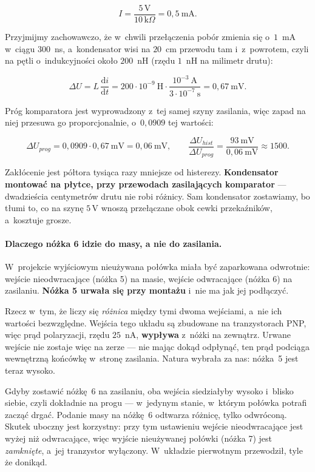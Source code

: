 \documentclass[a4paper,11pt]{article}
\newcommand{\kohm}{\,\mathrm{k}\Omega}
\newcommand{\volt}{\,\mathrm{V}}
\begin{document}
\[
I=\frac{5\volt}{10\kohm}=0{,}5\ \mathrm{mA}.
\]

Przyjmijmy zachowawczo, że w~chwili przełączenia pobór zmienia się o~$1$~mA
w~ciągu $300$~ns, a~kondensator wisi na $20$~cm przewodu tam i~z~powrotem, czyli
na pętli o~indukcyjności około $200$~nH (rzędu $1$~nH na milimetr drutu):

\[
\Delta U = L\,\frac{\mathrm{d}i}{\mathrm{d}t}
         = 200\cdot10^{-9}\ \mathrm{H}\cdot\frac{10^{-3}\ \mathrm{A}}{3\cdot10^{-7}\ \mathrm{s}}
         = 0{,}67\ \mathrm{mV}.
\]

Próg komparatora jest wyprowadzony z~tej samej szyny zasilania, więc zapad na niej
przesuwa go proporcjonalnie, o~$0{,}0909$ tej wartości:

\[
\Delta U_{prog}=0{,}0909\cdot0{,}67\ \mathrm{mV}=0{,}06\ \mathrm{mV},
\qquad
\frac{\Delta U_{hist}}{\Delta U_{prog}}=\frac{93\ \mathrm{mV}}{0{,}06\ \mathrm{mV}}\approx 1500 .
\]

Zakłócenie jest półtora tysiąca razy mniejsze od histerezy. \textbf{Kondensator
montować na płytce, przy przewodach zasilających komparator} --- dwadzieścia
centymetrów drutu nie robi różnicy. Sam kondensator zostawiamy, bo tłumi to, co
na szynę $5\volt$ wnoszą przełączane obok cewki przekaźników, a~kosztuje grosze.

\paragraph{Dlaczego nóżka 6 idzie do masy, a nie do zasilania.} W~projekcie
wyjściowym nieużywana połówka miała być zaparkowana odwrotnie: wejście nieodwracające
(nóżka 5) na masie, wejście odwracające (nóżka 6) na zasilaniu. \textbf{Nóżka 5
urwała się przy montażu} i~nie ma jak jej podłączyć.

Rzecz w~tym, że liczy się \emph{różnica} między tymi dwoma wejściami, a~nie ich
wartości bezwzględne. Wejścia tego układu są zbudowane na tranzystorach PNP, więc
prąd polaryzacji, rzędu $25$~nA, \textbf{wypływa} z~nóżki na zewnątrz. Urwane wejście
nie zostaje więc na zerze --- nie mając dokąd odpłynąć, ten prąd podciąga wewnętrzną
końcówkę w~stronę zasilania. Natura wybrała za nas: nóżka~5 jest teraz wysoko.

Gdyby zostawić nóżkę~6 na zasilaniu, oba wejścia siedziałyby wysoko i~blisko siebie,
czyli dokładnie na progu --- w~jedynym stanie, w~którym połówka potrafi zacząć drgać.
Podanie masy na nóżkę~6 odtwarza różnicę, tylko odwróconą. Skutek uboczny jest
korzystny: przy tym ustawieniu wejście nieodwracające jest wyżej niż odwracające,
więc wyjście nieużywanej połówki (nóżka 7) jest \emph{zamknięte}, a~jej tranzystor
wyłączony. W~układzie pierwotnym przewodził, tyle że donikąd.
\end{document}
